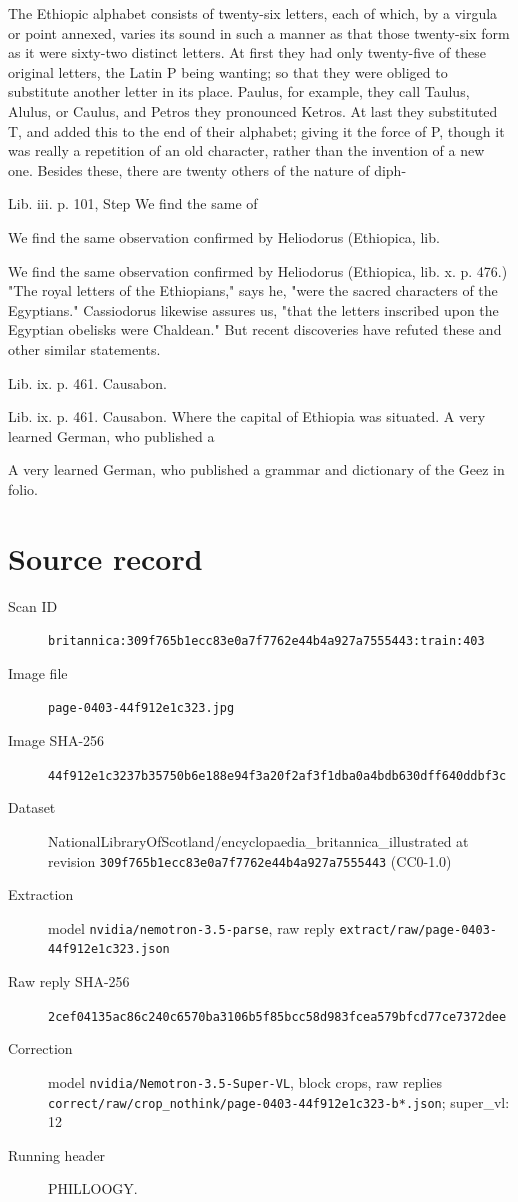 \documentclass{article}
\begin{document}
The Ethiopic alphabet consists of twenty-six letters, each of which, by a virgula or point annexed, varies its sound in such a manner as that those twenty-six form as it were sixty-two distinct letters. At first they had only twenty-five of these original letters, the Latin P being wanting; so that they were obliged to substitute another letter in its place. Paulus, for example, they call Taulus, Alulus, or Caulus, and Petros they pronounced Ketros. At last they substituted T, and added this to the end of their alphabet; giving it the force of P, though it was really a repetition of an old character, rather than the invention of a new one. Besides these, there are twenty others of the nature of diph-

Lib. iii. p. 101, Step
We find the same of

We find the same observation confirmed by Heliodorus (Ethiopica, lib.

We find the same observation confirmed by Heliodorus (Ethiopica, lib. x. p. 476.) "The royal letters of the Ethiopians," says he, "were the sacred characters of the Egyptians." Cassiodorus likewise assures us, "that the letters inscribed upon the Egyptian obelisks were Chaldean." But recent discoveries have refuted these and other similar statements.

Lib. ix. p. 461. Causabon.

Lib. ix. p. 461. Causabon.
Where the capital of Ethiopia was situated.
A very learned German, who published a

A very learned German, who published a grammar and dictionary of the Geez in folio.


\section*{Source record}
\begin{description}
\item[Scan ID] \texttt{britannica:309f765b1ecc83e0a7f7762e44b4a927a7555443:train:403}
\item[Image file] \texttt{page-0403-44f912e1c323.jpg}
\item[Image SHA-256] \texttt{44f912e1c3237b35750b6e188e94f3a20f2af3f1dba0a4bdb630dff640ddbf3c}
\item[Dataset] NationalLibraryOfScotland/encyclopaedia\_britannica\_illustrated at revision \texttt{309f765b1ecc83e0a7f7762e44b4a927a7555443} (CC0-1.0)
\item[Extraction] model \texttt{nvidia/nemotron-3.5-parse}, raw reply \texttt{extract/raw/page-0403-44f912e1c323.json}
\item[Raw reply SHA-256] \texttt{2cef04135ac86c240c6570ba3106b5f85bcc58d983fcea579bfcd77ce7372dee}
\item[Correction] model \texttt{nvidia/Nemotron-3.5-Super-VL}, block crops, raw replies \texttt{correct/raw/crop\_nothink/page-0403-44f912e1c323-b*.json}; super\_vl: 12
\item[Running header] PHILLOOGY.
\end{description}
\end{document}

